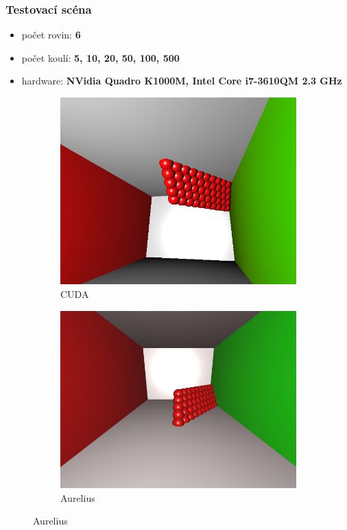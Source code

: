 \documentclass{beamer}
\begin{document}
	\begin{frame}[t,fragile]
		\frametitle{Testovací scéna}					
		
		\begin{itemize}
	\item počet rovin: \textbf{6}
	\item počet koulí: \textbf{5, 10, 20, 50, 100, 500}
	\item hardware: \textbf{NVidia Quadro K1000M, Intel Core i7-3610QM 2.3 GHz}
\end{itemize}

	\begin{figure}[htbp]
        \centering

        \begin{subfigure}[b]{0.49\textwidth}
                \includegraphics[width=\textwidth]{img/test-scene.png}
                \caption{\scriptsize{CUDA}}
        \end{subfigure}   
        \begin{subfigure}[b]{0.49\textwidth}
                \includegraphics[width=\textwidth]{img/test-scene-aurelius.png}
                \caption{\scriptsize{Aurelius}}


\end{subfigure}
\end{figure}
\end{frame}
\end{document}
